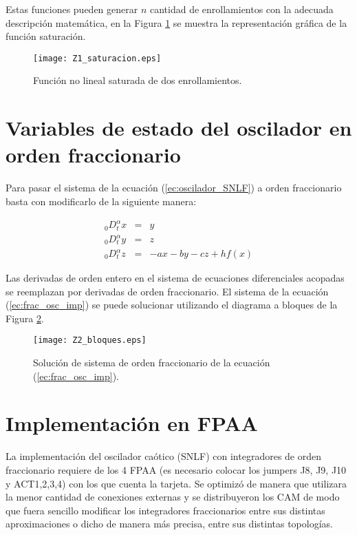 	Estas funciones pueden generar $n$ cantidad de enrollamientos con la adecuada descripción matemática, en la Figura \ref{fig:Z1_saturacion} se muestra la representación gráfica de la función saturación. 
	
	\begin{figure}[!ht]
		\caption{Función no lineal saturada de dos enrollamientos.} 
		\label{fig:Z1_saturacion}
		\centering
		\texttt{[image: Z1\_saturacion.eps]}
	\end{figure}
	
		\section{Variables de estado del oscilador en orden fraccionario}
	 Para pasar el sistema de la ecuación (\ref{ec:oscilador_SNLF}) a orden fraccionario basta con modificarlo de la siguiente manera:
	 
	 \begin{equation}
		 \begin{array}{lcl}
		_{0}D_{t}^{\alpha}x & = & y \\
		_{0}D_{t}^{\alpha}y  & = & z\\
		_{0}D_{t}^{\alpha}z  & = & -ax - by -cz + hf(x)
		\end{array}
		\label{ec:frac_osc_imp}
	\end{equation}
	
	Las derivadas de orden entero en el sistema de ecuaciones diferenciales acopadas se reemplazan por derivadas de orden fraccionario. El sistema de la ecuación (\ref{ec:frac_osc_imp}) se puede solucionar utilizando el diagrama a bloques de la Figura \ref{fig:Z2_bloques}.
	
	\begin{figure}[!ht]
		\caption{Solución de sistema de orden fraccionario de la ecuación (\ref{ec:frac_osc_imp}).}
		\label{fig:Z2_bloques}
		\centering
		\texttt{[image: Z2\_bloques.eps]}
	\end{figure}
	
	\section{Implementación en FPAA}
	
	La implementación del oscilador caótico (SNLF) con integradores de orden fraccionario requiere de los 4 FPAA (es necesario colocar los jumpers J8, J9, J10 y ACT1,2,3,4) con los que cuenta la tarjeta. Se optimizó de manera que utilizara la menor cantidad de conexiones externas y se distribuyeron los CAM de modo que fuera sencillo modificar los integradores fraccionarios entre sus distintas aproximaciones o dicho de manera más precisa, entre  sus distintas topologías. 
	
